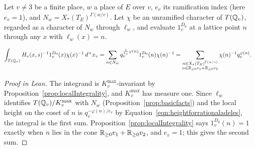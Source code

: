 \begin{equationnode}

\label{eqn:localfourierassumovern}


\leanok

Let $v\neq3$ be a finite place, $w$ a place of $E$ over $v$, $e_v$ its ramification index (here $e_v=1$), and $N_w=X_\ast(T_E)^{\Gamma(w/v)}$. Let $\chi$ be an unramified character of $T(\mathbb{Q}_v)$, regarded as a character of $N_w$ through $\ell_w$, and evaluate $1_v^{D_0}$ at a lattice point $n$ through any $x$ with $\ell_w(x)=n$.

\begin{equation*} \int_{T(\mathbb{Q}_v)} H_v(x,s)^{-1}1_v^{D_0}(x)\chi(x)^{-1}\,d^\times x_v =\sum_{n \in N_w} q_v^{\frac{1}{e_v}\varphi(n)} 1_v^{D_0}(n) \chi(n)^{-1} = \sum_{\substack{n \in X_\ast(T_{E})^{\Gamma(w/v)}\\ n \in \mathbb R_{\geq 0}v_1+\mathbb R_{\geq 0}v_2} } \chi(n)^{-1} q_v^{\varphi(n)} . \end{equation*}

\end{equationnode}

\begin{proof}[Proof in Lean]

\leanok


The integrand is $K_v^{\mathrm{max}}$-invariant by Proposition~\ref{prop:localIntegrality}, and $K_v^{\mathrm{max}}$ has measure one. Since $\ell_w$ identifies $T(\mathbb{Q}_v)/K_v^{\mathrm{max}}$ with $N_w$ (Proposition~\ref{prop:basicfacts}) and the local height on the coset of $n$ is $q_v^{-\varphi(n)/e_v}$ by Equation~\ref{eqn:heightforrationaladeles}, the integral is the first sum. Proposition~\ref{prop:localIntegrality} says $1_v^{D_0}(n)=1$ exactly when $n$ lies in the cone $\mathbb{R}_{\geq0}v_1+\mathbb{R}_{\geq0}v_2$, and $e_v=1$; this gives the second sum.

\end{proof}

